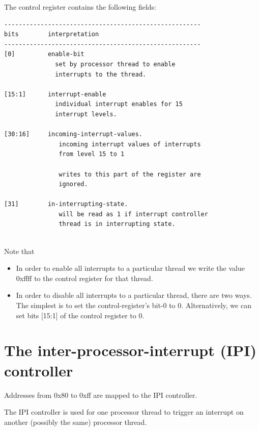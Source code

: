 \documentclass{article}[12pt]
\begin{document}
The control register contains the following fields:
\begin{verbatim}
------------------------------------------------------
bits        interpretation
------------------------------------------------------
[0]         enable-bit
              set by processor thread to enable
              interrupts to the thread.

[15:1]      interrupt-enable
              individual interrupt enables for 15
              interrupt levels. 

[30:16]     incoming-interrupt-values. 
               incoming interrupt values of interrupts
               from level 15 to 1
               
               writes to this part of the register are
               ignored.

[31]        in-interrupting-state.
               will be read as 1 if interrupt controller
               thread is in interrupting state.
               
\end{verbatim}

Note that
\begin{itemize}
\item In order to enable all interrupts to a particular thread 
we write the value 0xffff to the control register for that thread.
\item In order to disable all interrupts to a particular thread,
there are two ways.  The simplest is to set the control-register's
bit-0 to 0.  Alternatively, we can set bits [15:1] of the control
register to 0.
\end{itemize}

\section{The inter-processor-interrupt (IPI) controller}

Addresses from 0x80 to 0xff are mapped to the IPI controller.

The IPI controller is used for one processor thread to
trigger an interrupt on another (possibly the same) processor thread.
\end{document}
